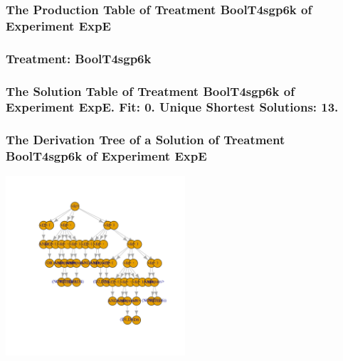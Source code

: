 \documentclass[18pt,c]{beamer}
\begin{document}
 \begin{frame}
 \fontsize{8pt}{9pt}\selectfont
 \frametitle{ The Production Table of Treatment BoolT4sgp6k of Experiment ExpE }

 \label{ExpEGrammarTable007.tex}  
 \end{frame}

 \begin{frame}
 \fontsize{8pt}{9pt}\selectfont
 \frametitle{ Treatment: BoolT4sgp6k }

 \label{ExpEStatsTable007.tex}  
 \end{frame}

 \begin{frame}
 \fontsize{8pt}{9pt}\selectfont
 \frametitle{ The Solution Table of Treatment BoolT4sgp6k of Experiment ExpE. Fit: 0. Unique Shortest Solutions: 13. }

 \label{ExpESolutionTable004.tex}  
 \end{frame}

 \begin{frame}
 \frametitle{ The Derivation Tree of a Solution of Treatment BoolT4sgp6k of Experiment ExpE }
 \begin{center}
\includegraphics[width=0.5\textwidth, angle=0]
{ExpEDerivationTreeFigure004.pdf}
 \end{center}
 \label{report/ExpEDerivationTreeFigure004.pdf}  
 \end{frame}
\end{document}
